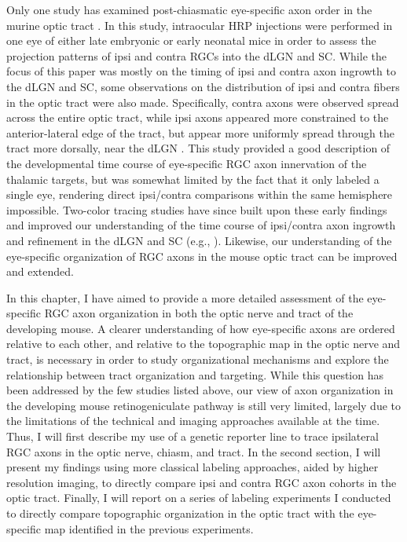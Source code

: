 Only one study has examined post-chiasmatic eye-specific axon order in the murine optic tract \cite{godement1984prenatal}.
In this study, intraocular HRP injections were performed in one eye of either late embryonic or early neonatal mice in order to assess the projection patterns of ipsi and contra RGCs into the dLGN and SC.
While the focus of this paper was mostly on the timing of ipsi and contra axon ingrowth to the dLGN and SC, some observations on the distribution of ipsi and contra fibers in the optic tract were also made.
Specifically, contra axons were observed spread across the entire optic tract, while ipsi axons appeared more constrained to the anterior-lateral edge of the tract, but appear more uniformly spread through the tract more dorsally, near the dLGN \cite{godement1984prenatal}.
This study provided a good description of the developmental time course of eye-specific RGC axon innervation of the thalamic targets, but was somewhat limited by the fact that it only labeled a single eye, rendering direct ipsi/contra comparisons within the same hemisphere impossible.
Two-color tracing studies have since built upon these early findings and improved our understanding of the time course of ipsi/contra axon ingrowth and refinement in the dLGN and SC (e.g., \cite{jaubert2005structural}).
Likewise, our understanding of the eye-specific organization of RGC axons in the mouse optic tract can be improved and extended.

In this chapter, I have aimed to provide a more detailed assessment of the eye-specific RGC axon organization in both the optic nerve and tract of the developing mouse.
A clearer understanding of how eye-specific axons are ordered relative to each other, and relative to the topographic map in the optic nerve and tract, is necessary in order to study organizational mechanisms and explore the relationship between tract organization and targeting.
While this question has been addressed by the few studies listed above, our view of axon organization in the developing mouse retinogeniculate pathway is still very limited, largely due to the limitations of the technical and imaging approaches available at the time.
Thus, I will first describe my use of a genetic reporter line to trace ipsilateral RGC axons in the optic nerve, chiasm, and tract.
In the second section, I will present my findings using more classical labeling approaches, aided by higher resolution imaging, to directly compare ipsi and contra RGC axon cohorts in the optic tract.
Finally, I will report on a series of labeling experiments I conducted to directly compare topographic organization in the optic tract with the eye-specific map identified in the previous experiments.